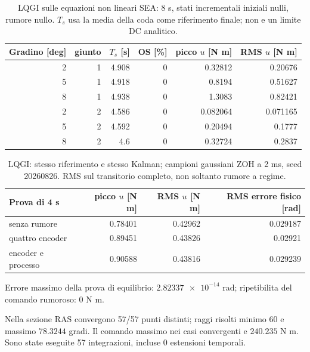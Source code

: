 \begin{table}[htbp]\centering\small
\begin{tabular}{rrrrrr}\toprule
Gradino [deg] & giunto & $T_s$ [s] & OS [\%] & picco $u$ [N m] & RMS $u$ [N m] \\
\midrule
2 & 1 & 4.908 & 0 & 0.32812 & 0.20676 \\
5 & 1 & 4.918 & 0 & 0.8194 & 0.51627 \\
8 & 1 & 4.938 & 0 & 1.3083 & 0.82421 \\
2 & 2 & 4.586 & 0 & 0.082064 & 0.071165 \\
5 & 2 & 4.592 & 0 & 0.20494 & 0.1777 \\
8 & 2 & 4.6 & 0 & 0.32724 & 0.2837 \\
\bottomrule\end{tabular}\caption{LQGI sulle equazioni non lineari SEA: 8 s, stati incrementali iniziali nulli, rumore nullo. $T_s$ usa la media della coda come riferimento finale; non e un limite DC analitico.}\label{tab:lqgi-nl}\end{table}
\begin{table}[htbp]\centering\small
\begin{tabular}{lrrr}\toprule
Prova di 4 s & picco $u$ [N m] & RMS $u$ [N m] & RMS errore fisico [rad] \\
\midrule
senza rumore & 0.78401 & 0.42962 & 0.029187 \\
quattro encoder & 0.89451 & 0.43826 & 0.02921 \\
encoder e processo & 0.90588 & 0.43816 & 0.029239 \\
\bottomrule\end{tabular}\caption{LQGI: stesso riferimento e stesso Kalman; campioni gaussiani ZOH a 2 ms, seed 20260826. RMS sul transitorio completo, non soltanto rumore a regime.}\label{tab:lqgi-noise}\end{table}
\par\noindent\begin{minipage}{\linewidth}Errore massimo della prova di equilibrio: $\num{2.82337e-14}$ rad; ripetibilita del comando rumoroso: $\num{0}$ N m.\end{minipage}\par
Nella sezione RAS convergono 57/57 punti distinti; raggi risolti minimo $\num{60}$ e massimo $\num{78.3244}$ gradi. Il comando massimo nei casi convergenti e $\num{240.235}$ N m. Sono state eseguite 57 integrazioni, incluse 0 estensioni temporali.
